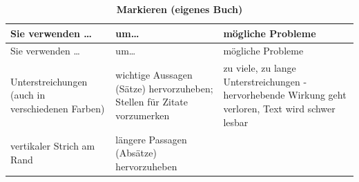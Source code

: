 \documentclass[]{book}
\theoremstyle{definition}
\theoremstyle{definition}
\theoremstyle{definition}
\theoremstyle{remark}
\begin{document}
\begin{longtable}[]{@{}lll@{}}
\caption{\textbf{\label{tab:markieren-eigenes-buch} Markieren (eigenes
Buch)}}\tabularnewline
\toprule
\begin{minipage}[b]{0.31\columnwidth}\raggedright\strut
Sie verwenden \ldots{}\strut
\end{minipage} & \begin{minipage}[b]{0.27\columnwidth}\raggedright\strut
um\ldots{}\strut
\end{minipage} & \begin{minipage}[b]{0.33\columnwidth}\raggedright\strut
mögliche Probleme\strut
\end{minipage}\tabularnewline
\midrule
\endfirsthead
\toprule
\begin{minipage}[b]{0.31\columnwidth}\raggedright\strut
Sie verwenden \ldots{}\strut
\end{minipage} & \begin{minipage}[b]{0.27\columnwidth}\raggedright\strut
um\ldots{}\strut
\end{minipage} & \begin{minipage}[b]{0.33\columnwidth}\raggedright\strut
mögliche Probleme\strut
\end{minipage}\tabularnewline
\midrule
\endhead
\begin{minipage}[t]{0.31\columnwidth}\raggedright\strut
Unterstreichungen (auch in verschiedenen Farben)\strut
\end{minipage} & \begin{minipage}[t]{0.27\columnwidth}\raggedright\strut
wichtige Aussagen (Sätze) hervorzuheben; Stellen für Zitate
vorzumerken\strut
\end{minipage} & \begin{minipage}[t]{0.33\columnwidth}\raggedright\strut
zu viele, zu lange Unterstreichungen - hervorhebende Wirkung geht
verloren, Text wird schwer lesbar \vspace{5mm}\strut
\end{minipage}\tabularnewline
\begin{minipage}[t]{0.31\columnwidth}\raggedright\strut
vertikaler Strich am Rand\strut
\end{minipage} & \begin{minipage}[t]{0.27\columnwidth}\raggedright\strut
längere Passagen (Absätze) hervorzuheben \vspace{5mm}\strut
\end{minipage} & \begin{minipage}[t]{0.33\columnwidth}\raggedright\strut

\end{minipage}
\end{longtable}
\end{document}
